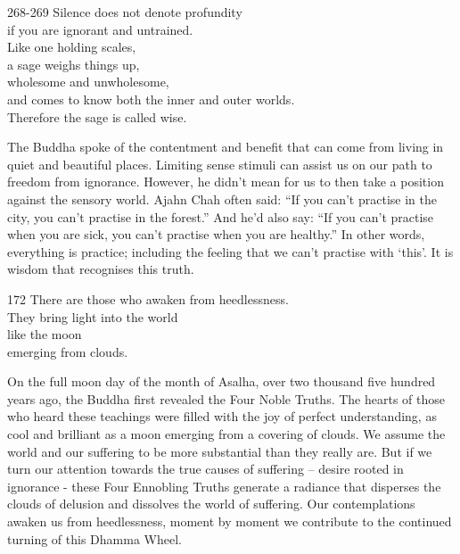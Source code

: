 
\begin{dhpVerse}{268-269}
\label{dhp-268}\label{dhp-269}
Silence does not denote profundity\\
if you are ignorant and untrained.\\
Like one holding scales,\\
a sage weighs things up,\\
wholesome and unwholesome,\\
and comes to know both the inner and outer worlds.\\
Therefore the sage is called wise.
\end{dhpVerse}

\begin{dhpRefl}

The Buddha spoke of the contentment and benefit that can come from
living in quiet and beautiful places. Limiting sense stimuli can
assist us on our path to freedom from ignorance. However, he didn't
mean for us to then take a position against the sensory world. Ajahn
Chah often said: ``If you can't practise in the city, you can't
practise in the forest.'' And he'd also say: ``If you can't practise
when you are sick, you can't practise when you are healthy.'' In
other words, everything is practice; including the feeling that we
can't practise with `this'. It is wisdom that recognises this truth.

\end{dhpRefl}


\begin{dhpVerse}{172}
\label{dhp-172}
There are those who awaken from heedlessness.\\
They bring light into the world\\
like the moon\\
emerging from clouds.
\end{dhpVerse}

\begin{dhpRefl}

On the full moon day of the month of Asalha, over two thousand five
hundred years ago, the Buddha first revealed the Four Noble Truths.
The hearts of those who heard these teachings were filled with the
joy of perfect understanding, as cool and brilliant as a moon
emerging from a covering of clouds. We assume the world and our
suffering to be more substantial than they really are. But if we turn
our attention towards the true causes of suffering -- desire rooted
in ignorance - these Four Ennobling Truths generate a radiance that
disperses the clouds of delusion and dissolves the world of
suffering. Our contemplations awaken us from heedlessness, moment by
moment we contribute to the continued turning of this Dhamma Wheel.

\end{dhpRefl}

